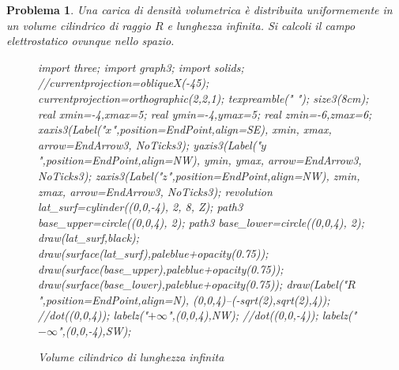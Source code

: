 \documentclass[b5paper,twoside]{book}
\newtheorem{problema}{Problema}
\let\oldhat\hat
\renewcommand{\vec}[1]{\mathbf{#1}}
\renewcommand{\hat}[1]{\widehat{\mathbf{#1}}}
\begin{document}
\begin{problema}
	Una carica di densità volumetrica è distribuita uniformemente in un 
	volume cilindrico di raggio $R$ e lunghezza infinita. Si calcoli 
	il campo elettrostatico ovunque nello spazio.
	\begin{figure}%
			\centering
			\begin{asy}[height=6cm,inline=true,attach=false,viewportwidth=\linewidth]
				import three;
				import graph3;
				import solids;
				//currentprojection=obliqueX(-45);
				currentprojection=orthographic(2,2,1);
				texpreamble("\let\oldhat\hat
				\renewcommand{\vec}[1]{\mathbf{#1}}
				\renewcommand{\hat}[1]{\oldhat{\mathbf{#1}}}");
				size3(8cm);
				real xmin=-4,xmax=5;
				real ymin=-4,ymax=5;
				real zmin=-6,zmax=6;
				xaxis3(Label("\small $x$",position=EndPoint,align=SE),
				xmin, xmax, arrow=EndArrow3, NoTicks3);
				yaxis3(Label("\small $y$",position=EndPoint,align=NW),
				ymin, ymax, arrow=EndArrow3, NoTicks3);
				zaxis3(Label("\small $z$",position=EndPoint,align=NW),
				zmin, zmax, arrow=EndArrow3, NoTicks3);
				revolution lat_surf=cylinder((0,0,-4), 2, 8, Z);
				path3 base_upper=circle((0,0,4), 2);
				path3 base_lower=circle((0,0,4), 2);
				draw(lat_surf,black);
				draw(surface(lat_surf),paleblue+opacity(0.75));
				draw(surface(base_upper),paleblue+opacity(0.75));
				draw(surface(base_lower),paleblue+opacity(0.75));
				draw(Label("$R$",position=EndPoint,align=N),
				(0,0,4)--(-sqrt(2),sqrt(2),4));
				//dot((0,0,4));
				labelz("$+\infty$",(0,0,4),NW);
				//dot((0,0,-4));
				labelz("$-\infty$",(0,0,-4),SW);
			\end{asy}
			\caption{Volume cilindrico di lunghezza infinita}
			\label{fig:cilindro_pieno_infinito}
		\end{figure}	
\end{problema}
\end{document}
